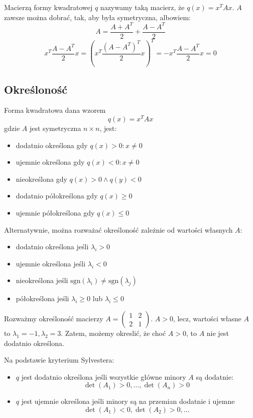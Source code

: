 \documentclass{../notatki}
\begin{document}
Macierzą formy kwadratowej $q$ nazywamy taką macierz, że $q(x) = x^TAx$.
$A$ zawsze można dobrać, tak, aby była symetryczna, albowiem:
$$
A = \frac{A + A^T}{2} + \frac{A - A^T}{2}
$$
$$
x^T \frac{A - A^T}{2}x = \left(x^T\frac{(A - A^T)^T}{2}x\right)^T = -x^T\frac{A
- A^T}{2}x = 0
$$

\subsection{Określoność}

Forma kwadratowa dana wzorem
$$
q(x) = x^T Ax
$$
gdzie $A$ jest symetryczna $n \times n$, jest:
\begin{itemize}
  \item dodatnio określona gdy $q(x) > 0 : x \neq 0$
  \item ujemnie określona gdy $q(x) < 0 : x \neq 0$
  \item nieokreślona gdy $q(x) > 0 \land q(y) < 0$
  \item dodatnio półokreślona gdy $q(x) \geq 0$
  \item ujemnie półokreślona gdy $q(x) \leq 0$
\end{itemize}

Alternatywnie, można rozważać określoność zależnie od wartości własnych $A$:
\begin{itemize}
  \item dodatnio określona jeśli $\lambda_i > 0$
  \item ujemnie określona jeśli $\lambda_i < 0$
  \item nieokreślona jeśli $\textrm{sgn}(\lambda_i) \neq
    \textrm{sgn}(\lambda_j)$
  \item półokreślona jeśli $\lambda_i \geq 0$ lub $\lambda_i \leq 0$
\end{itemize}

\begin{examplebox}
  Rozważmy określoność macierzy $A =
  \begin{pmatrix}
    1 & 2 \\
    2 & 1
  \end{pmatrix}$. $A > 0$, lecz, wartości własne $A$ to $\lambda_1 =
  -1,\lambda_2 = 3$.
  Zatem, możemy okreslić, że choć $A > 0$, to $A$ nie jest dodatnio określona.
\end{examplebox}

Na podstawie kryterium Sylvestera:
\begin{itemize}
  \item $q$ jest dodatnio określona jeśli wszystkie główne minory $A$
    są dodatnie:
    $$
    \det(A_1) > 0, \dots, \det(A_n) > 0
    $$
  \item $q$ jest ujemnie określona jeśli minory są na przemian dodatnie i ujemne
    $$
    \det(A_1) < 0, \det(A_2) > 0, \dots
    $$
\end{itemize}
\end{document}
